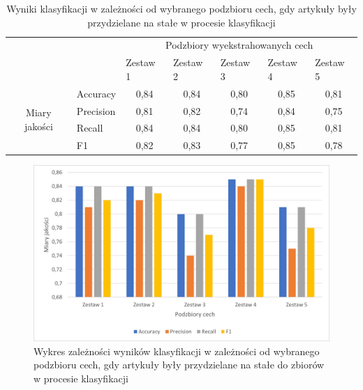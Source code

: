 \documentclass{classrep}
\begin{document}
\begin{table}[!htbp]
\caption{Wyniki klasyfikacji w zależności od wybranego podzbioru cech, gdy artykuły były przydzielane na stałe w procesie klasyfikacji}
\centering
\label{table:podzbiory}
\begin{tabular}{cl|c|c|c|c|c|}
\cline{3-7}
\multicolumn{1}{l}{}                                 &           & \multicolumn{5}{c|}{Podzbiory wyekstrahowanych cech}                                                                                                          \\ \cline{3-7} 
\multicolumn{1}{l}{}                                 &           & \multicolumn{1}{l|}{Zestaw 1} & \multicolumn{1}{l|}{Zestaw 2} & \multicolumn{1}{l|}{Zestaw 3} & \multicolumn{1}{l|}{Zestaw 4} & \multicolumn{1}{l|}{Zestaw 5} \\ \hline
\multicolumn{1}{|c|}{\multirow{4}{*}{Miary jakości}} & Accuracy  & 0,84                          & 0,84                          & 0,80                          & 0,85                          & 0,81                          \\ \cline{2-7} 
\multicolumn{1}{|c|}{}                               & Precision & 0,81                          & 0,82                          & 0,74                          & 0,84                          & 0,75                          \\ \cline{2-7} 
\multicolumn{1}{|c|}{}                               & Recall    & 0,84                          & 0,84                          & 0,80                          & 0,85                          & 0,81                          \\ \cline{2-7} 
\multicolumn{1}{|c|}{}                               & F1        & 0,82                          & 0,83                          & 0,77                          & 0,85                          & 0,78                          \\ \hline
\end{tabular}
\end{table}
\begin{figure}[H]
    \centering
    \includegraphics[width=14cm]{features_const_bar_chart.png}
    \caption{Wykres zależności wyników klasyfikacji w zależności od wybranego podzbioru cech, gdy artykuły były przydzielane na stałe do zbiorów w procesie klasyfikacji}
    \label{rysunek:podzbiory}
\end{figure}
\end{document}

